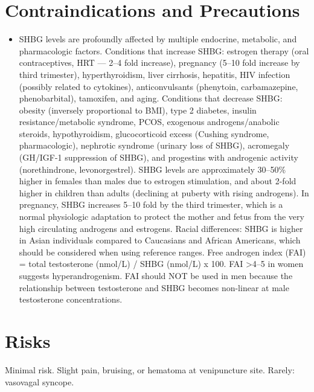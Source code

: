 \section*{Contraindications and Precautions}
\begin{itemize}
  \item SHBG levels are profoundly affected by multiple endocrine, metabolic, and pharmacologic factors. Conditions that increase SHBG: estrogen therapy (oral contraceptives, HRT --- 2--4 fold increase), pregnancy (5--10 fold increase by third trimester), hyperthyroidism, liver cirrhosis, hepatitis, HIV infection (possibly related to cytokines), anticonvulsants (phenytoin, carbamazepine, phenobarbital), tamoxifen, and aging. Conditions that decrease SHBG: obesity (inversely proportional to BMI), type 2 diabetes, insulin resistance/metabolic syndrome, PCOS, exogenous androgens/anabolic steroids, hypothyroidism, glucocorticoid excess (Cushing syndrome, pharmacologic), nephrotic syndrome (urinary loss of SHBG), acromegaly (GH/IGF-1 suppression of SHBG), and progestins with androgenic activity (norethindrone, levonorgestrel). SHBG levels are approximately 30--50\% higher in females than males due to estrogen stimulation, and about 2-fold higher in children than adults (declining at puberty with rising androgens). In pregnancy, SHBG increases 5--10 fold by the third trimester, which is a normal physiologic adaptation to protect the mother and fetus from the very high circulating androgens and estrogens. Racial differences: SHBG is higher in Asian individuals compared to Caucasians and African Americans, which should be considered when using reference ranges. Free androgen index (FAI) = total testosterone (nmol/L) / SHBG (nmol/L) x 100. FAI >4--5 in women suggests hyperandrogenism. FAI should NOT be used in men because the relationship between testosterone and SHBG becomes non-linear at male testosterone concentrations.
\end{itemize}
\section*{Risks}
Minimal risk. Slight pain, bruising, or hematoma at venipuncture site. Rarely: vasovagal syncope.

